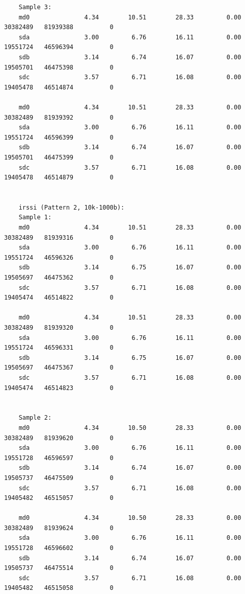 \documentclass{article}
\begin{document}
\begin{verbatim}
	Sample 3:
	md0               4.34        10.51        28.33         0.00   30382489   81939388          0
	sda               3.00         6.76        16.11         0.00   19551724   46596394          0
	sdb               3.14         6.74        16.07         0.00   19505701   46475398          0
	sdc               3.57         6.71        16.08         0.00   19405478   46514874          0

	md0               4.34        10.51        28.33         0.00   30382489   81939392          0
	sda               3.00         6.76        16.11         0.00   19551724   46596399          0
	sdb               3.14         6.74        16.07         0.00   19505701   46475399          0
	sdc               3.57         6.71        16.08         0.00   19405478   46514879          0


	irssi (Pattern 2, 10k-1000b):
	Sample 1:
	md0               4.34        10.51        28.33         0.00   30382489   81939316          0
	sda               3.00         6.76        16.11         0.00   19551724   46596326          0
	sdb               3.14         6.75        16.07         0.00   19505697   46475362          0
	sdc               3.57         6.71        16.08         0.00   19405474   46514822          0

	md0               4.34        10.51        28.33         0.00   30382489   81939320          0
	sda               3.00         6.76        16.11         0.00   19551724   46596331          0
	sdb               3.14         6.75        16.07         0.00   19505697   46475367          0
	sdc               3.57         6.71        16.08         0.00   19405474   46514823          0


	Sample 2:
	md0               4.34        10.50        28.33         0.00   30382489   81939620          0
	sda               3.00         6.76        16.11         0.00   19551728   46596597          0
	sdb               3.14         6.74        16.07         0.00   19505737   46475509          0
	sdc               3.57         6.71        16.08         0.00   19405482   46515057          0

	md0               4.34        10.50        28.33         0.00   30382489   81939624          0
	sda               3.00         6.76        16.11         0.00   19551728   46596602          0
	sdb               3.14         6.74        16.07         0.00   19505737   46475514          0
	sdc               3.57         6.71        16.08         0.00   19405482   46515058          0



\end{verbatim}
\end{document}
